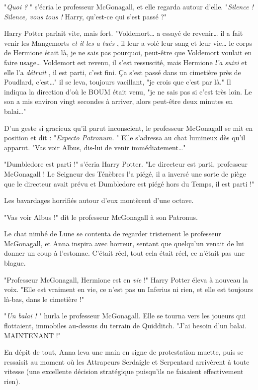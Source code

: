 "\emph{Quoi ?} " s'écria le professeur McGonagall, et elle regarda autour d'elle. "\emph{Silence ! Silence, vous tous !}  Harry, qu'est-ce qui s'est passé ?"

Harry Potter parlait vite, mais fort. "Voldemort… a essayé de revenir… il a fait venir les Mangemorts \emph{et il les a tués} , il leur a volé leur sang et leur vie… le corps de Hermione était là, je ne sais pas pourquoi, peut-être que Voldemort voulait en faire usage… Voldemort est revenu, il s'est ressuscité, mais Hermione \emph{l'a suivi}  et elle l'a \emph{détruit} , il est parti, c'est fini. Ça s'est passé dans un cimetière près de Poudlard, c'est…" il se leva, toujours vacillant, "je crois que c'est par là." Il indiqua la direction d'où le BOUM était venu, "je ne sais pas si c'est très loin. Le son a mis environ vingt secondes à arriver, alors peut-être deux minutes en balai…"

D'un geste si gracieux qu'il parut inconscient, le professeur McGonagall se mit en position et dit : "\emph{Expecto Patronum.} " Elle s'adressa au chat lumineux dès qu'il apparut. "Vas voir Albus, dis-lui de venir immédiatement…"

"Dumbledore est parti !" s'écria Harry Potter. "Le directeur est parti, professeur McGonagall ! Le Seigneur des Ténèbres l'a piégé, il a inversé une sorte de piège que le directeur avait prévu et Dumbledore est piégé hors du Temps, il est parti !"

Les bavardages horrifiés autour d'eux montèrent d'une octave.

"Vas voir Albus !" dit le professeur McGonagall à son Patronus.

Le chat nimbé de Lune se contenta de regarder tristement le professeur McGonagall, et Anna inspira avec horreur, sentant que quelqu'un venait de lui donner un coup à l'estomac. C'était réel, tout cela était réel, ce n'était pas une blague.

"Professeur McGonagall, Hermione est en \emph{vie}  !" Harry Potter éleva à nouveau la voix. "Elle est vraiment en vie, ce n'est pas un Inferius ni rien, et elle est toujours là-bas, dans le cimetière !"

"\emph{Un balai !} " hurla le professeur McGonagall. Elle se tourna vers les joueurs qui flottaient, immobiles au-dessus du terrain de Quidditch. "J'ai besoin d'un balai. MAINTENANT !"

En dépit de tout, Anna leva une main en signe de protestation muette, puis se ressaisit au moment où les Attrapeurs Serdaigle et Serpentard arrivèrent à toute vitesse (une excellente décision stratégique puisqu'ils ne faisaient effectivement rien).

